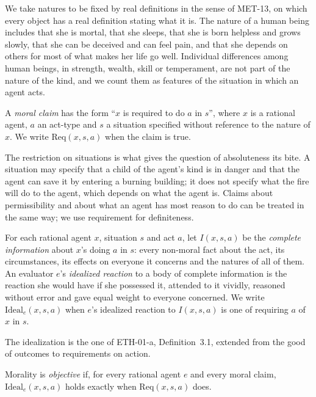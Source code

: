\documentclass{situationist-preprint}
\begin{document}
We take natures to be fixed by real definitions in the sense of MET-13, on which every object has a real definition stating what it is. The nature of a human being includes that she is mortal, that she sleeps, that she is born helpless and grows slowly, that she can be deceived and can feel pain, and that she depends on others for most of what makes her life go well. Individual differences among human beings, in strength, wealth, skill or temperament, are not part of the nature of the kind, and we count them as features of the situation in which an agent acts.

\begin{definition}\label{d:claims}
A \emph{moral claim} has the form \enquote{$x$ is required to do $a$ in $s$}, where $x$ is a rational agent, $a$ an act-type and $s$ a situation specified without reference to the nature of $x$. We write $\mathrm{Req}(x,s,a)$ when the claim is true.
\end{definition}

The restriction on situations is what gives the question of absoluteness its bite. A situation may specify that a child of the agent's kind is in danger and that the agent can save it by entering a burning building; it does not specify what the fire will do to the agent, which depends on what the agent is. Claims about permissibility and about what an agent has most reason to do can be treated in the same way; we use requirement for definiteness.

\begin{definition}\label{d:ideal}
For each rational agent $x$, situation $s$ and act $a$, let $I(x,s,a)$ be the \emph{complete information} about $x$'s doing $a$ in $s$: every non-moral fact about the act, its circumstances, its effects on everyone it concerns and the natures of all of them. An evaluator $e$'s \emph{idealized reaction} to a body of complete information is the reaction she would have if she possessed it, attended to it vividly, reasoned without error and gave equal weight to everyone concerned. We write $\mathrm{Ideal}_e(x,s,a)$ when $e$'s idealized reaction to $I(x,s,a)$ is one of requiring $a$ of $x$ in $s$.
\end{definition}

The idealization is the one of ETH-01-a, Definition~3.1, extended from the good of outcomes to requirements on action.

\begin{definition}[Objectivity]\label{d:objective}
Morality is \emph{objective} if, for every rational agent $e$ and every moral claim, $\mathrm{Ideal}_e(x,s,a)$ holds exactly when $\mathrm{Req}(x,s,a)$ does.
\end{definition}
\end{document}
